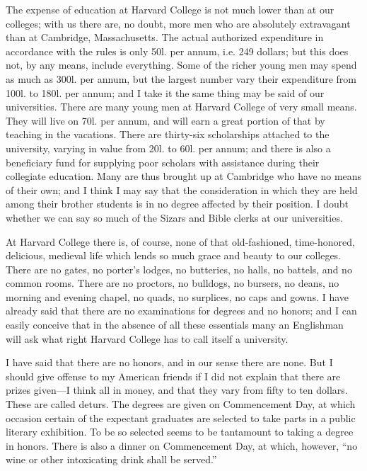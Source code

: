 The expense of education at Harvard College is not much lower than
at our colleges; with us there are, no doubt, more men who are
absolutely extravagant than at Cambridge, Massachusetts.  The
actual authorized expenditure in accordance with the rules is only
50l. per annum, i.e. 249 dollars; but this does not, by any means,
include everything.  Some of the richer young men may spend as much
as 300l. per annum, but the largest number vary their expenditure
from 100l. to 180l. per annum; and I take it the same thing may be
said of our universities.  There are many young men at Harvard
College of very small means.  They will live on 70l. per annum, and
will earn a great portion of that by teaching in the vacations.
There are thirty-six scholarships attached to the university,
varying in value from 20l. to 60l. per annum; and there is also a
beneficiary fund for supplying poor scholars with assistance during
their collegiate education.  Many are thus brought up at Cambridge
who have no means of their own; and I think I may say that the
consideration in which they are held among their brother students
is in no degree affected by their position.  I doubt whether we can
say so much of the Sizars and Bible clerks at our universities.

At Harvard College there is, of course, none of that old-fashioned,
time-honored, delicious, medieval life which lends so much grace
and beauty to our colleges.  There are no gates, no porter's
lodges, no butteries, no halls, no battels, and no common rooms.
There are no proctors, no bulldogs, no bursers, no deans, no
morning and evening chapel, no quads, no surplices, no caps and
gowns.  I have already said that there are no examinations for
degrees and no honors; and I can easily conceive that in the
absence of all these essentials many an Englishman will ask what
right Harvard College has to call itself a university.

I have said that there are no honors, and in our sense there are
none.  But I should give offense to my American friends if I did
not explain that there are prizes given---I think all in money, and
that they vary from fifty to ten dollars.  These are called deturs.
The degrees are given on Commencement Day, at which occasion
certain of the expectant graduates are selected to take parts in a
public literary exhibition.  To be so selected seems to be
tantamount to taking a degree in honors.  There is also a dinner on
Commencement Day, at which, however, ``no wine or other intoxicating
drink shall be served.''

